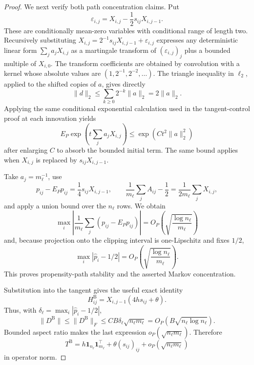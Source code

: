 \documentclass{article}
\begin{document}
\begin{proof}
We next verify both path concentration claims.  Put
\[
 \varepsilon_{i,j}=X_{i,j}-\frac12s_{ij}X_{i,j-1}.
\]
These are conditionally mean-zero variables with conditional range of length two.  Recursively substituting
\(X_{i,j}=2^{-1}s_{ij}X_{i,j-1}+\varepsilon_{i,j}\) expresses any deterministic linear form \(\sum_j a_jX_{i,j}\) as a martingale transform of \((\varepsilon_{i,j})_j\) plus a bounded multiple of \(X_{i,0}\).  The transform coefficients are obtained by convolution with a kernel whose absolute values are \((1,2^{-1},2^{-2},\ldots)\).  The triangle inequality in \(\ell_2\), applied to the shifted copies of \(a\), gives directly
\[
 \lVert d\rVert_2
 \le\sum_{k\ge0}2^{-k}\lVert a\rVert_2
 =2\lVert a\rVert_2.
\]
Applying the same conditional exponential calculation used in the tangent-control proof at each innovation yields
\[
 E_P\exp\!\left(t\sum_ja_jX_{i,j}\right)
 \le \exp(Ct^2\lVert a\rVert_2^2)
\]
after enlarging \(C\) to absorb the bounded initial term.  The same bound applies when \(X_{i,j}\) is replaced by \(s_{ij}X_{i,j-1}\).

Take \(a_j=m_\ell^{-1}\), use
\[
 p_{ij}-E_Pp_{ij}=\frac14s_{ij}X_{i,j-1},
 \qquad
 \frac1{m_\ell}\sum_jA_{ij}-\frac12
 =\frac1{2m_\ell}\sum_jX_{i,j},
\]
and apply a union bound over the \(n_\ell\) rows.  We obtain
\[
 \max_i\left|\frac1{m_\ell}\sum_j(p_{ij}-E_Pp_{ij})\right|
 =O_P\!\left(\sqrt{\frac{\log n_\ell}{m_\ell}}\right)
\]
and, because projection onto the clipping interval is one-Lipschitz and fixes \(1/2\),
\[
 \max_i|\widehat p_i-1/2|
 =O_P\!\left(\sqrt{\frac{\log n_\ell}{m_\ell}}\right).
\]
This proves propensity-path stability and the asserted Markov concentration.

Substitution into the tangent gives the useful exact identity
\[
 H^{\mathrm B}_{ij}=X_{i,j-1}(4hs_{ij}+\theta).
\]
Thus, with \(\delta_\ell=\max_i|\widehat p_i-1/2|\),
\[
 \lVert D^{\mathrm B}\rVert
 \le \lVert D^{\mathrm B}\rVert_F
 \le C B\delta_\ell\sqrt{n_\ell m_\ell}
 =O_P(B\sqrt{n_\ell\log n_\ell}).
\]
Bounded aspect ratio makes the last expression \(o_P(\sqrt{n_\ell m_\ell})\).  Therefore
\[
 T^{\mathrm B}
 =h\mathbf1_{n_\ell}\mathbf1_{m_\ell}^\top
 +\theta(s_{ij})_{ij}+o_P(\sqrt{n_\ell m_\ell})
\]
in operator norm.


\end{proof}
\end{document}
